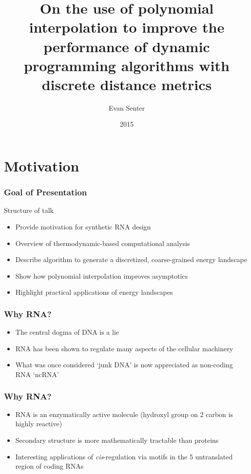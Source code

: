 \documentclass{beamer}
\title[RNA Thermodynamics with the FFT]{On the use of polynomial interpolation to improve the performance of dynamic programming algorithms with discrete distance metrics}
\author{Evan Senter}
\date{2015}
\newcommand{\pryme}{\textquotesingle\xspace}
\begin{document}
\frame{\titlepage}


\section{Motivation}

\begin{frame}
  \frametitle{Goal of Presentation}
  \begin{block}{Structure of talk}
  \begin{itemize}
  \item Provide motivation for synthetic RNA design
  \item Overview of thermodynamic-based computational analysis
  \item Describe algorithm to generate a discretized, coarse-grained energy landscape
  \item Show how polynomial interpolation improves asymptotics
  \item Highlight practical applications of energy landscapes
  \end{itemize}
  \end{block}
\end{frame}

\begin{frame}
  \frametitle{Why RNA?}
  \begin{itemize}
  \item The central dogma of DNA is a lie
  \item RNA has been shown to regulate many aspects of the cellular machinery
  \item What was once considered `junk DNA' is now appreciated as non-coding RNA `ncRNA'
  \end{itemize}
\end{frame}

\begin{frame}
  \frametitle{Why RNA?}
  \begin{itemize}
  \item RNA is an enzymatically active molecule (hydroxyl group on 2\pryme carbon is highly reactive)
  \item Secondary structure is more mathematically tractable than proteins
  \item Interesting applications of {\em cis}-regulation via motifs in the 5\pryme untranslated region of coding RNAs
  \end{itemize}
\end{frame}
\end{document}
